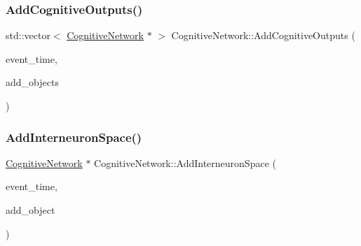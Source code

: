 \mbox{\label{classCognitiveNetwork_a6299433811b76f0ccb97cf69fe9bfb66}} 
\subsubsection{\texorpdfstring{Add\+Cognitive\+Outputs()}{AddCognitiveOutputs()}}
{\footnotesize\ttfamily std\+::vector$<$ \mbox{\hyperlink{classCognitiveNetwork}{Cognitive\+Network}} $\ast$ $>$ Cognitive\+Network\+::\+Add\+Cognitive\+Outputs (\begin{DoxyParamCaption}\item[{std\+::chrono\+::time\+\_\+point$<$ \mbox{\hyperlink{universe_8h_a0ef8d951d1ca5ab3cfaf7ab4c7a6fd80}{Clock}} $>$}]{event\+\_\+time,  }\item[{std\+::vector$<$ \mbox{\hyperlink{classCognitiveNetwork}{Cognitive\+Network}} $\ast$$>$}]{add\+\_\+objects }\end{DoxyParamCaption})}

\mbox{\label{classCognitiveNetwork_ac6a7e01f097d0cb6434eb8fa7640c214}} 
\subsubsection{\texorpdfstring{Add\+Interneuron\+Space()}{AddInterneuronSpace()}}
{\footnotesize\ttfamily \mbox{\hyperlink{classCognitiveNetwork}{Cognitive\+Network}} $\ast$ Cognitive\+Network\+::\+Add\+Interneuron\+Space (\begin{DoxyParamCaption}\item[{std\+::chrono\+::time\+\_\+point$<$ \mbox{\hyperlink{universe_8h_a0ef8d951d1ca5ab3cfaf7ab4c7a6fd80}{Clock}} $>$}]{event\+\_\+time,  }\item[{\mbox{\hyperlink{classCognitiveNetwork}{Cognitive\+Network}} $\ast$}]{add\+\_\+object }\end{DoxyParamCaption})}

\mbox{\label{classCognitiveNetwork_aeafe16b9f44ae1316c072a85e726ee83}} 
